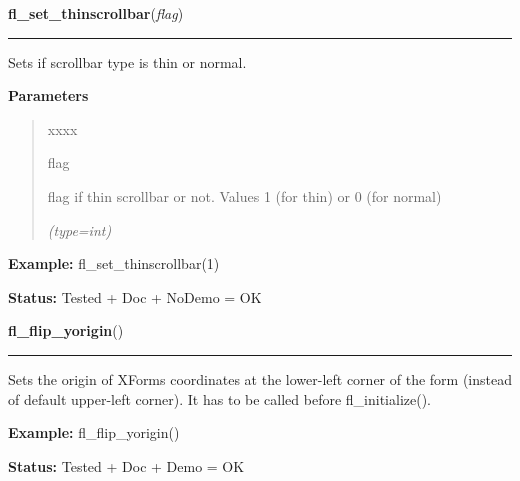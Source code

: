 \hspace{.8\funcindent}\begin{boxedminipage}{\funcwidth}

    \raggedright \textbf{fl\_set\_thinscrollbar}(\textit{flag})

    \vspace{-1.5ex}

    \rule{\textwidth}{0.5\fboxrule}
\setlength{\parskip}{2ex}
    Sets if scrollbar type is thin or normal.

\setlength{\parskip}{1ex}
      \textbf{Parameters}
      \vspace{-1ex}

      \begin{quote}
        \begin{Ventry}{xxxx}

          \item[flag]

          flag if thin scrollbar or not. Values 1 (for thin) or 0 (for 
          normal)

            {\it (type=int)}

        \end{Ventry}

      \end{quote}

\textbf{Example:} fl\_set\_thinscrollbar(1)



\textbf{Status:} Tested + Doc + NoDemo = OK



    \end{boxedminipage}

    \label{xformslib:flbasic:fl_flip_yorigin}

    \vspace{0.5ex}

\hspace{.8\funcindent}\begin{boxedminipage}{\funcwidth}

    \raggedright \textbf{fl\_flip\_yorigin}()

    \vspace{-1.5ex}

    \rule{\textwidth}{0.5\fboxrule}
\setlength{\parskip}{2ex}
    Sets the origin of XForms coordinates at the lower-left corner of the 
    form (instead of default upper-left corner). It has to be called before
    fl\_initialize().

\setlength{\parskip}{1ex}
\textbf{Example:} fl\_flip\_yorigin()



\textbf{Status:} Tested + Doc + Demo = OK



    \end{boxedminipage}

